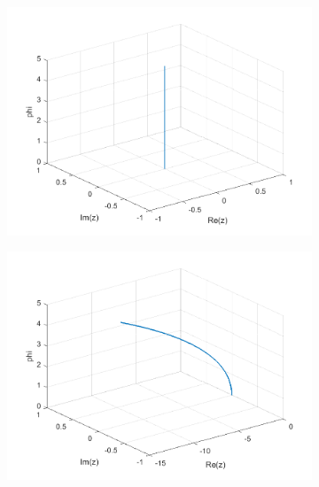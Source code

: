 \documentclass[a4paper,11pt]{article}
\begin{document}
\begin{figure}[!h]
\begin{subfigure}[c]{0.3\textwidth}
\includegraphics[width=\linewidth]{plot6_musg10.png}
\end{subfigure}
\begin{subfigure}[c]{0.3\textwidth}
\includegraphics[width=\linewidth]{plot6_musg11.png}
\end{subfigure}
\begin{subfigure}[c]{0.3\textwidth}

\end{subfigure}
\end{figure}
\end{document}
